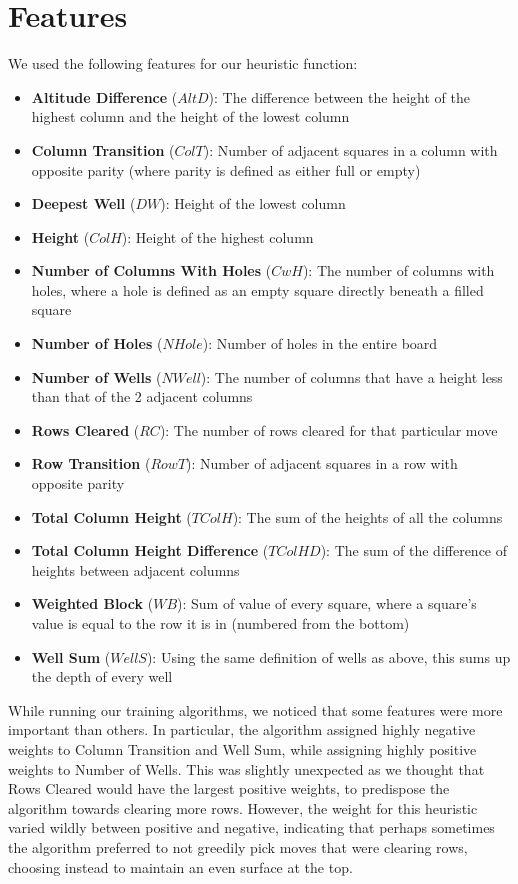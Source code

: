 \documentclass[12pt]{article}
\begin{document}
    \section{Features}
    We used the following features for our heuristic function:
    \begin{itemize}
		\setlength\itemsep{-1mm}
        \item \textbf{Altitude Difference} ($AltD$): The difference between the height of the highest
        column and the height of the lowest column
		\item \textbf{Column Transition} ($ColT$): Number of adjacent squares in a column with opposite parity (where parity is defined as either full or empty)
		\item \textbf{Deepest Well} ($DW$): Height of the lowest column
        \item \textbf{Height} ($ColH$): Height of the highest column
		\item \textbf{Number of Columns With Holes} ($CwH$): The number of columns with holes, where a hole
		is defined as an empty square directly beneath a filled square
        \item \textbf{Number of Holes} ($NHole$): Number of holes in the entire board
        \item \textbf{Number of Wells} ($NWell$): The number of columns that have a height less than that of the 2
        adjacent columns
		\item \textbf{Rows Cleared} ($RC$): The number of rows cleared for that particular move
		\item \textbf{Row Transition} ($RowT$): Number of adjacent squares in a row with opposite parity
        \item \textbf{Total Column Height} ($TColH$): The sum of the heights of all the columns
        \item \textbf{Total Column Height Difference} ($TColHD$): The sum of the difference of heights between adjacent columns
        \item \textbf{Weighted Block} ($WB$): Sum of value of every square, where a square's value is equal to
		the row it is in (numbered from the bottom)
        \item \textbf{Well Sum} ($WellS$): Using the same definition of wells as above, this sums up
		the depth of every well
    \end{itemize}

    While running our training algorithms, we noticed that some features were more
	important than others. In particular, the algorithm assigned highly negative
	weights to Column Transition and Well Sum, while assigning highly positive
	weights to Number of Wells. This was slightly unexpected as we thought that
	Rows Cleared would have the largest positive weights, to predispose the algorithm
	towards clearing more rows. However, the weight for this heuristic varied wildly
	between positive and negative, indicating that perhaps sometimes the algorithm
	preferred to not greedily pick moves that were clearing rows, choosing instead
	to maintain an even surface at the top.
\end{document}

